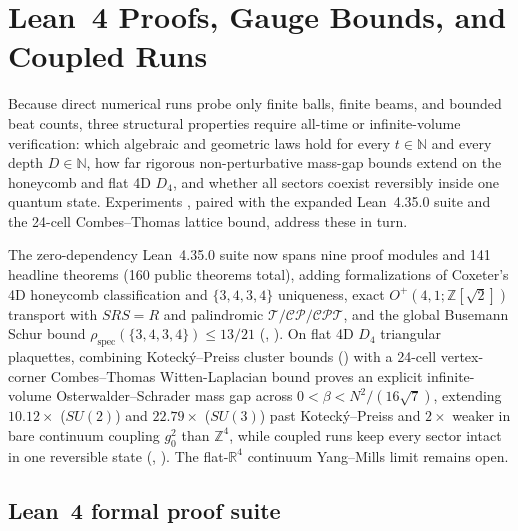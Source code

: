 \section{Lean~4 Proofs, Gauge Bounds, and Coupled Runs}
\label{sec:unified}

Because direct numerical runs probe only finite balls, finite beams, and bounded beat counts, three structural
properties require all-time or infinite-volume verification: which algebraic and geometric laws hold for every
$t \in \mathbb{N}$ and every depth $D \in \mathbb{N}$, how far rigorous non-perturbative mass-gap bounds extend on the
honeycomb and flat 4D $D_4$, and whether all sectors coexist reversibly inside one quantum state. Experiments
, paired with the expanded Lean~4.35.0 suite and the 24-cell Combes--Thomas lattice bound,
address these in turn.

The zero-dependency Lean~4.35.0 suite now spans nine proof modules and 141 headline theorems (160 public theorems
total), adding formalizations of Coxeter's 4D honeycomb classification and $\{3,4,3,4\}$ uniqueness, exact
$O^+(4,1; \mathbb{Z}[\sqrt{2}])$ transport with $S R S = R$ and palindromic $\mathcal{T}/\mathcal{CP}/\mathcal{CPT}$,
and the global Busemann Schur bound $\rho_{\mathrm{spec}}(\{3,4,3,4\}) \le 13/21$ (,
). On flat 4D $D_4$ triangular plaquettes, combining Koteck\'y--Preiss cluster bounds
() with a 24-cell vertex-corner Combes--Thomas Witten-Laplacian bound proves an explicit
infinite-volume Osterwalder--Schrader mass gap across $0 < \beta < N^2/(16\sqrt{7})$, extending $10.12\times$
($SU(2)$) and $22.79\times$ ($SU(3)$) past Koteck\'y--Preiss and $2\times$ weaker in bare continuum coupling $g_0^2$
than $\mathbb{Z}^4$, while coupled runs keep every sector intact in one reversible state (,
). The flat-$\mathbb{R}^4$ continuum Yang--Mills limit \cite{jaffe2000ym} remains open.

\subsection{Lean~4 formal proof suite}


